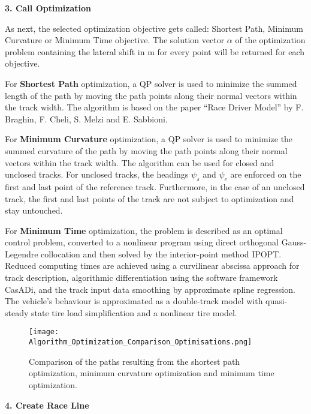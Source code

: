 \textbf{3. Call Optimization}

As next, the selected optimization objective gets called: Shortest Path, Minimum Curvature or Minimum Time objective. The solution vector $\alpha$ of the optimization problem containing the lateral shift in m for every point will be returned for each objective.

For \textbf{Shortest Path} optimization, a QP solver is used to minimize the summed length of the path by moving the path points along their normal vectors within the track width. The algorithm is based on the paper ``Race Driver Model'' by F. Braghin, F. Cheli, S. Melzi and E. Sabbioni. \cite{shortest_path}

For \textbf{Minimum Curvature} optimization, a QP solver is used to minimize the summed curvature of the path by moving the path points along their normal vectors within the track width. The algorithm can be used for closed and unclosed tracks. For unclosed tracks, the headings $\psi_s$ and $\psi_e$ are enforced on the first and last point of the reference track. Furthermore, in the case of an unclosed track, the first and last points of the track are not subject to optimization and stay untouched. \cite{minimum_curvature_trajectory_planning}

For \textbf{Minimum Time} optimization, the problem is described as an optimal control problem, converted to a nonlinear program using direct orthogonal Gauss-Legendre collocation and then solved by the interior-point method IPOPT. Reduced computing
times are achieved using a curvilinear abscissa approach for track description, algorithmic differentiation using the software framework CasADi, and the track input data smoothing by approximate spline regression. The vehicle's behaviour is approximated as a double-track model with quasi-steady state tire load simplification and a nonlinear tire model. \cite{minimum_time_trajectory_planning} \cite{powertrain_behaviour}

\begin{figure}[H]
    \centering
    \texttt{[image: Algorithm\_Optimization\_Comparison\_Optimisations.png]}
    \caption{Comparison of the paths resulting from the shortest path optimization, minimum curvature optimization and minimum time optimization. \cite{minimum_curvature_trajectory_planning}}
    \label{fig:Optimization Algorithm Comparing Different Optimisations}
\end{figure}

\textbf{4. Create Race Line}

